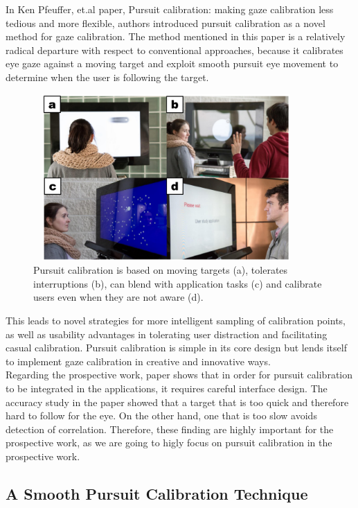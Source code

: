 In Ken Pfeuffer, et.al \cite{4} paper, Pursuit calibration: making gaze calibration less tedious and more flexible, authors introduced pursuit calibration as a novel method for gaze calibration. The method mentioned in this paper is a relatively radical departure with respect to conventional approaches, because it calibrates eye gaze against a moving target and exploit smooth pursuit eye movement to determine when the user is following the target. 
\begin{figure}[!hbt]
  \centering
  \includegraphics[width=4in,height=2.5in]{kenpfeffer.png}
  \caption{Pursuit calibration is based on moving targets (a), tolerates interruptions (b), can blend with application tasks (c) and calibrate users even when they are not aware (d).}
  \label{kenpfeffer}
\end{figure}

This leads to novel strategies for more intelligent sampling of calibration points, as well as usability advantages in tolerating user distraction and facilitating casual calibration. Pursuit calibration is simple in its core design but lends itself to implement gaze calibration in creative and innovative ways.\\

Regarding the prospective work, paper shows that in order for pursuit calibration to be integrated in the applications, it requires careful interface design. The accuracy study in the paper showed that a target that is too quick and therefore hard to follow for the eye. On the other hand, one that is too slow avoids detection of correlation.  Therefore, these finding are highly important for the prospective work, as we are going to higly focus on pursuit calibration in the prospective work.

\subsection{A Smooth Pursuit Calibration Technique}

